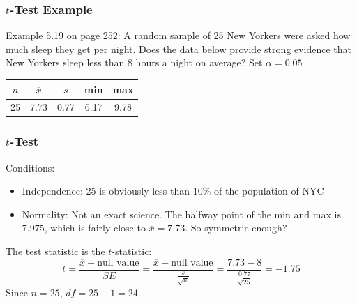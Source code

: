 \documentclass[handout]{beamer}
\newcommand{\blue}[1]{\textcolor{blue2}{#1}}
\newcommand{\xbar}{\overline{x}}
\begin{document}
\begin{frame}
\frametitle{$t$-Test Example}

Example 5.19 on page 252:  A random sample of 25 New Yorkers were asked how much sleep they get per night. Does the data below provide strong evidence that New Yorkers sleep less than 8 hours a night on average?  Set $\alpha=0.05$

\vspace{0.5cm}
\begin{center}
\begin{tabular}{c|c|c|c|c}
$n$ & $\xbar$ & $s$ & min & max\\
\hline
25 & 7.73 & 0.77 & 6.17 & 9.78\\
\end{tabular}
\end{center}

\end{frame}


\begin{frame}
\frametitle{$t$-Test}
%
%
Conditions:
\begin{itemize}
\item \blue{Independence}: 25 is obviously less than 10\% of the population of NYC
\item \blue{Normality}: Not an exact science.  The halfway point of the min and max is 7.975, which is fairly close to $\xbar=7.73$.  So symmetric enough? 
\end{itemize}

\vspace{0.25cm}

The test statistic is the $t$-statistic:
\[
t = \frac{\overline{x}-\mbox{null value}}{SE} = \frac{\overline{x}-\mbox{null value}}{\frac{s}{\sqrt n}} = \frac{7.73 - 8}{\frac{0.77}{\sqrt{25}}} = -1.75
\]
Since $n=25$, $df=25-1=24$.
\end{frame}
\end{document}

